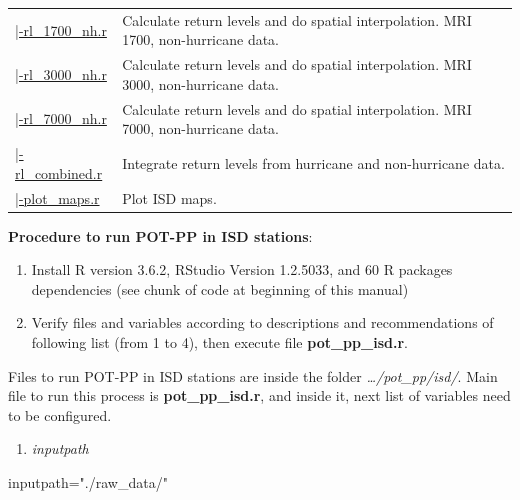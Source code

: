 \documentclass[12pt,oneside]{reedthesis}
\newenvironment{Shaded}{\begin{snugshade}}{\end{snugshade}}
\newcommand{\NormalTok}[1]{#1}
\newcommand{\StringTok}[1]{\textcolor[rgb]{0.31,0.60,0.02}{#1}}
\providecommand{\tightlist}{%
  \setlength{\itemsep}{0pt}\setlength{\parskip}{0pt}}
\begin{document}
\begin{longtable}[t]{>{\raggedright\arraybackslash}p{1.3in}>{\raggedright\arraybackslash}p{4.9in}}
\href{ftp://ftp.geocorp.co/windthesis/code/pot_pp/isd/maps/return_levels_1700_nh.r}{\;\;\;\;\;\;\;\;|-rl\_1700\_nh.r} & Calculate return levels and do spatial interpolation. MRI 1700, non-hurricane data.\\
\href{ftp://ftp.geocorp.co/windthesis/code/pot_pp/isd/maps/return_levels_3000_nh.r}{\;\;\;\;\;\;\;\;|-rl\_3000\_nh.r} & Calculate return levels and do spatial interpolation. MRI 3000, non-hurricane data.\\
\href{ftp://ftp.geocorp.co/windthesis/code/pot_pp/isd/maps/return_levels_7000_nh.r}{\;\;\;\;\;\;\;\;|-rl\_7000\_nh.r} & Calculate return levels and do spatial interpolation. MRI 7000, non-hurricane data.\\
\href{ftp://ftp.geocorp.co/windthesis/code/pot_pp/isd/maps/return_levels_combined.r}{\;\;\;\;\;\;\;\;|-rl\_combined.r} & Integrate return levels from hurricane and non-hurricane data.\\
\href{ftp://ftp.geocorp.co/windthesis/code/pot_pp/isd/maps/plot_maps.r}{\;\;\;\;\;\;\;\;|-plot\_maps.r} & Plot ISD maps.\\
\bottomrule
\end{longtable}
\endgroup{}

\textbf{Procedure to run POT-PP in ISD stations}:
\begin{enumerate}
\def\labelenumi{\arabic{enumi}.}
\item
  Install R version 3.6.2, RStudio Version 1.2.5033, and 60 R packages dependencies (see chunk of code at beginning of this manual)
\item
  Verify files and variables according to descriptions and recommendations of following list (from 1 to 4), then execute file \textbf{pot\_pp\_isd.r}.
\end{enumerate}
Files to run POT-PP in ISD stations are inside the folder \emph{\ldots/pot\_pp/isd/}. Main file to run this process is \textbf{pot\_pp\_isd.r}, and inside it, next list of variables need to be configured.
\begin{enumerate}
\def\labelenumi{\arabic{enumi}.}
\tightlist
\item
  \emph{inputpath}
\end{enumerate}
\scriptsize

\vspace{0.4cm}
\begin{Shaded}
\begin{Highlighting}[]
\NormalTok{      inputpath=}\StringTok{"./raw_data/"}
\end{Highlighting}
\end{Shaded}
\normalsize
\end{document}
